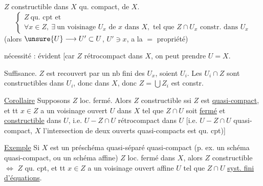 $Z$ constructible dans $X$ qu. compact,
    de  $X$.
\[
\left\{\begin{array}{l}
Z\ \text{qu. cpt et}\\
\forall x\in Z,\ \exists\ \text{un voisinage }U_x\text{ de }x\text{ dans }X,
\text{ tel que }Z\cap U_x\text{ constr. dans }U_x
\end{array}\right.
\]
(alors $\unsure{U}\longrightarrow U'\subset U$, $U'\ni x$, a la $=$ propriété)

nécessité : évident [car $Z$ rétrocompact dans $X$, 
 on peut prendre $U=X$.

Suffisance. $Z$ est recouvert par un nb fini des $U_x$, soient $U_i$.
Les $U_i\cap Z$ sont constructibles dans $U_i$, donc dans $X$,
donc $Z=\bigcup Z_i$ est constr.

\uline{Corollaire} Supposons $Z$ loc. fermé.
Alors $Z$  constructible
ssi $Z$ est \uline{quasi-compact}, et tt $x\in Z$ a un voisinage ouvert
$U$ dans $X$ tel que $Z\cap U$ soit \uline{fermé} et
\uline{constructible} dans $U$, i.e. $U-Z\cap U$ rétrocompact dans $U$
[i.e. $U-Z\cap U$ quasi-compact,
 $X$ l'intersection de deux ouverts quasi-compacts
est qu. cpt)]

\uline{Exemple} Si $X$ est un préschéma quasi-séparé quasi-compact
(p. ex. un schéma quasi-compact, ou un schéma affine) 
$Z$ loc. fermé dans $X$, alors $Z$ constructible $\Longleftrightarrow$
$Z$ qu. cpt, et tt $x\in Z$ a un voisinage ouvert affine $U$ tel que
$Z\cap U$  \uline{syst. fini} \uline{d'équations}.

